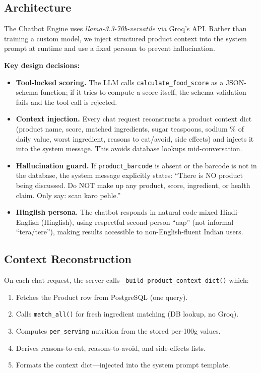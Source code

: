 \documentclass[conference]{IEEEtran}
\begin{document}
\subsection{Architecture}

The Chatbot Engine uses \textit{llama-3.3-70b-versatile} via Groq's API.
Rather than training a custom model, we inject structured product context into
the system prompt at runtime and use a fixed persona to prevent hallucination.

\textbf{Key design decisions:}
\begin{itemize}
  \item \textbf{Tool-locked scoring.} The LLM calls \texttt{calculate\_food\_score}
    as a JSON-schema function; if it tries to compute a score itself, the
    schema validation fails and the tool call is rejected.
  \item \textbf{Context injection.} Every chat request reconstructs a product
    context dict (product name, score, matched ingredients, sugar teaspoons,
    sodium \% of daily value, worst ingredient, reasons to eat/avoid, side effects)
    and injects it into the system message. This avoids database lookups mid-conversation.
  \item \textbf{Hallucination guard.} If \texttt{product\_barcode} is absent or
    the barcode is not in the database, the system message explicitly states:
    ``There is NO product being discussed. Do NOT make up any product, score,
    ingredient, or health claim. Only say: scan karo pehle.''
  \item \textbf{Hinglish persona.} The chatbot responds in natural code-mixed
    Hindi-English (Hinglish), using respectful second-person ``aap'' (not informal
    ``tera/tere''), making results accessible to non-English-fluent Indian users.
\end{itemize}

\subsection{Context Reconstruction}

On each chat request, the server calls \texttt{\_build\_product\_context\_dict()}
which:
\begin{enumerate}
  \item Fetches the Product row from PostgreSQL (one query).
  \item Calls \texttt{match\_all()} for fresh ingredient matching (DB lookup, no Groq).
  \item Computes \texttt{per\_serving} nutrition from the stored per-100g values.
  \item Derives reasons-to-eat, reasons-to-avoid, and side-effects lists.
  \item Formats the context dict---injected into the system prompt template.
\end{enumerate}
\end{document}
